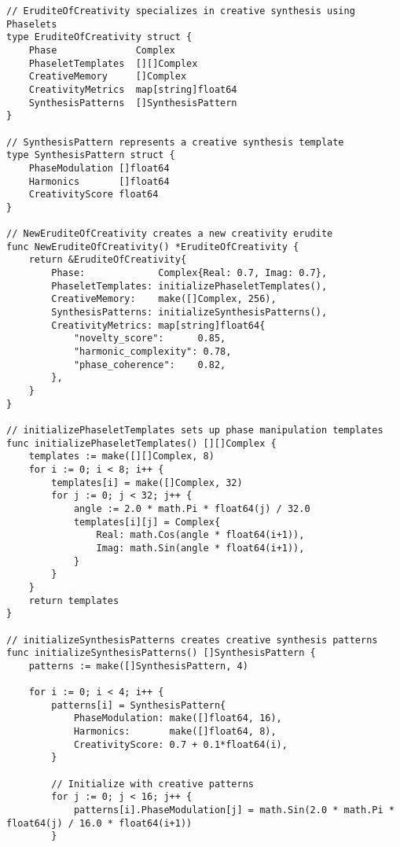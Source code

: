 \begin{tcolorbox}[colback=CodeBackground, colframe=DarkGray, title=Erudite of Creativity Implementation, fonttitle=\bfseries]
\begin{verbatim}
// EruditeOfCreativity specializes in creative synthesis using Phaselets
type EruditeOfCreativity struct {
    Phase              Complex
    PhaseletTemplates  [][]Complex
    CreativeMemory     []Complex
    CreativityMetrics  map[string]float64
    SynthesisPatterns  []SynthesisPattern
}

// SynthesisPattern represents a creative synthesis template
type SynthesisPattern struct {
    PhaseModulation []float64
    Harmonics       []float64
    CreativityScore float64
}

// NewEruditeOfCreativity creates a new creativity erudite
func NewEruditeOfCreativity() *EruditeOfCreativity {
    return &EruditeOfCreativity{
        Phase:             Complex{Real: 0.7, Imag: 0.7},
        PhaseletTemplates: initializePhaseletTemplates(),
        CreativeMemory:    make([]Complex, 256),
        SynthesisPatterns: initializeSynthesisPatterns(),
        CreativityMetrics: map[string]float64{
            "novelty_score":      0.85,
            "harmonic_complexity": 0.78,
            "phase_coherence":    0.82,
        },
    }
}

// initializePhaseletTemplates sets up phase manipulation templates
func initializePhaseletTemplates() [][]Complex {
    templates := make([][]Complex, 8)
    for i := 0; i < 8; i++ {
        templates[i] = make([]Complex, 32)
        for j := 0; j < 32; j++ {
            angle := 2.0 * math.Pi * float64(j) / 32.0
            templates[i][j] = Complex{
                Real: math.Cos(angle * float64(i+1)),
                Imag: math.Sin(angle * float64(i+1)),
            }
        }
    }
    return templates
}

// initializeSynthesisPatterns creates creative synthesis patterns
func initializeSynthesisPatterns() []SynthesisPattern {
    patterns := make([]SynthesisPattern, 4)
    
    for i := 0; i < 4; i++ {
        patterns[i] = SynthesisPattern{
            PhaseModulation: make([]float64, 16),
            Harmonics:       make([]float64, 8),
            CreativityScore: 0.7 + 0.1*float64(i),
        }
        
        // Initialize with creative patterns
        for j := 0; j < 16; j++ {
            patterns[i].PhaseModulation[j] = math.Sin(2.0 * math.Pi * float64(j) / 16.0 * float64(i+1))
        }
        

\end{verbatim}
\end{tcolorbox}
